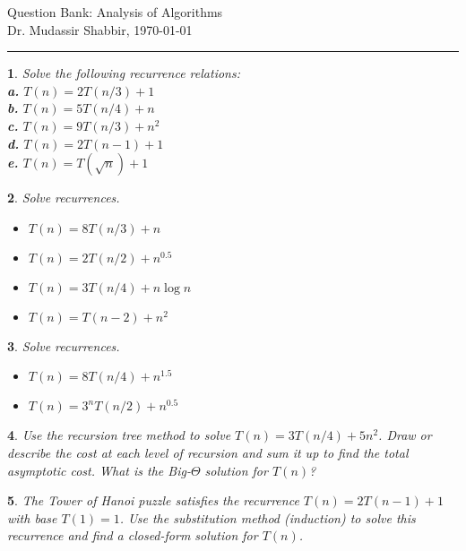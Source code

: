 \documentclass[%
addpoints]{exam}
\theoremstyle{problem}
\newtheorem{p}{}
\begin{document}
 \pagestyle{empty}
 \begin{FlushLeft}
Question Bank: Analysis of Algorithms\\Dr. Mudassir Shabbir,
\today
\end{FlushLeft}

	
\thispagestyle{myheadings}
\rule{500pt}{1.5pt}


\begin{p}
Solve the following recurrence relations:\\
\vspace{10pt}
\textbf{a.} \( T(n) = 2T(n/3) + 1 \)\\
\textbf{b.} \( T(n) = 5T(n/4) + n \)\\
\textbf{c.} \( T(n) = 9T(n/3) + n^2 \)\\
\textbf{d.} \( T(n) = 2T(n-1) + 1 \)\\
\textbf{e.} \( T(n) = T(\sqrt{n}) + 1 \)\\
\hfill \end{p}

\begin{p}
Solve recurrences.
\hfill \end{p}
\begin{itemize}
			\item $T(n) = 8T(n/3) + n$
			\item $T(n) = 2T(n/2) + n^{0.5}$
			\item $T(n) = 3T(n/4) + n\log n$
			\item $T(n) = T(n-2) + n^2$
\end{itemize} 

\begin{p}
Solve recurrences.
\hfill \end{p}
\begin{itemize}
			\item $T(n) = 8T(n/4) + n^{1.5}$
			\item $T(n) = 3^nT(n/2) + n^{0.5}$
\end{itemize}

\begin{p}
Use the recursion tree method to solve \(T(n) = 3T(n/4) + 5n^2\). Draw or describe the cost at each level of recursion and sum it up to find the total asymptotic cost. What is the Big-\(\Theta\) solution for \(T(n)\)?  
\hfill\end{p}

\begin{p}
The Tower of Hanoi puzzle satisfies the recurrence \(T(n) = 2T(n-1) + 1\) with base \(T(1) = 1\). Use the substitution method (induction) to solve this recurrence and find a closed-form solution for \(T(n)\).  
\hfill\end{p}
\end{document}
